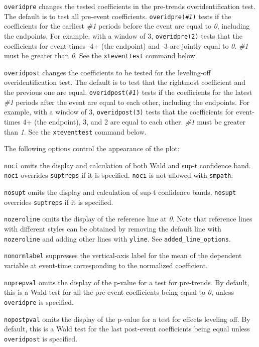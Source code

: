 \documentclass[12pt]{article}
\begin{document}
\hangpara
\texttt{overidpre} changes the tested coefficients in the pre-trends overidentification test.
The default is to test all pre-event coefficients.
\texttt{overidpre({\it \#1})} tests if the coefficients for the earliest {\it \#1} periods before the event are equal to {\it 0}, including the endpoints.
For example, with a window of 3, \texttt{overidpre(2)} tests that the coefficients for event-times -4+ (the endpoint) and -3 are jointly equal to {\it 0}.
{\it \#1} must be greater than {\it 0}.
See the \texttt{xteventtest} command below.

\hangpara
\texttt{overidpost} changes the coefficients to be tested for the leveling-off overidentification test.
The default is to test that the rightmost coefficient and the previous one are equal.
\texttt{overidpost({\it \#1})} tests if the coefficients for the latest {\it \#1} periods after the event are equal to each other, including the endpoints.
For example, with a window of 3, \texttt{overidpost(3)} tests that the coefficients for event-times 4+ (the endpoint), 3, and 2 are equal to each other.
{\it \#1} must be greater than {\it 1}.
See the \texttt{xteventtest} command below.

\hangpara
The following options control the appearance of the plot:

\hangpara
\texttt{noci} omits the display and calculation of both Wald and sup-t confidence band. \texttt{noci} overrides \texttt{suptreps} if it is specified.  \texttt{noci} is not allowed with \texttt{smpath}.

\hangpara
\texttt{nosupt} omits the display and calculation of sup-t confidence bands. \texttt{nosupt} overrides \texttt{suptreps} if it is specified.

\hangpara
\texttt{nozeroline} omits the display of the reference line at {\it 0}. Note that reference lines with different styles can be obtained by removing the default line with \texttt{nozeroline} and adding other lines with \texttt{yline}. See \texttt{added\_line\_options}.

\hangpara
\texttt{nonormlabel} suppresses the vertical-axis label for the mean of the dependent variable at event-time corresponding to the normalized coefficient.

\hangpara
\texttt{noprepval} omits the display of the p-value for a test for pre-trends.
By default, this is a Wald test for all the pre-event coefficients being equal to {\it 0}, unless \texttt{overidpre} is specified.

\hangpara
\texttt{nopostpval} omits the display of the p-value for a test for effects leveling off.
By default, this is a Wald test for the last post-event coefficients being equal unless \texttt{overidpost} is specified.
\end{document}
